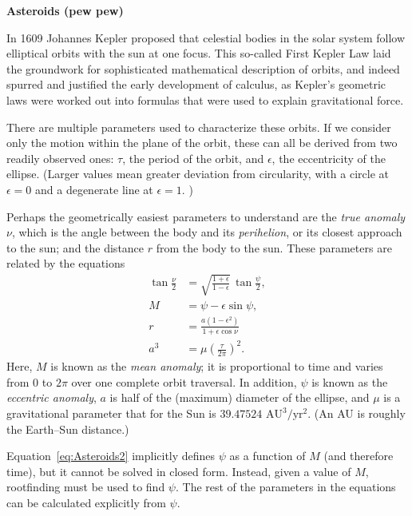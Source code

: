 \documentclass[11pt,twoside]{fncextra}
\begin{document}
\begin{center}
  \bf Asteroids (pew pew)
\end{center}

In 1609 Johannes Kepler proposed that celestial bodies in the solar system follow elliptical orbits with the sun at one focus. This so-called First Kepler Law laid the groundwork for sophisticated mathematical description of orbits, and indeed spurred and justified the early development of calculus, as Kepler's geometric laws were worked out into formulas that were used to explain gravitational force.

There are multiple parameters used to characterize these orbits. If we consider only the motion within the plane of the orbit, these can all be derived from two readily observed ones: $\tau$, the period of the orbit, and $\epsilon$, the eccentricity of the ellipse. (Larger values mean greater deviation from circularity, with a circle at $\epsilon=0$ and a degenerate line at $\epsilon=1$. )

Perhaps the geometrically easiest parameters to understand are the \emph{true anomaly} $\nu$, which is the angle between the body and its \emph{perihelion}, or its closest approach to the sun; and the distance $r$ from the body to the sun. These parameters are related by the equations \begin{align}
  \tan \frac{\nu}{2} &= \sqrt{\frac{1+\epsilon}{1-\epsilon}}\,
    \tan \frac{\psi}{2}, \label{eq:Asteroids1} \\
  M &= \psi - \epsilon \sin \psi, \label{eq:Asteroids2} \\
  r &=  \frac{a(1-\epsilon^2)}{1+\epsilon \cos \nu} \\
  a^3 &= \mu \left(\frac{\tau}{2\pi}\right)^2.
\end{align}
Here, $M$ is known as the \emph{mean anomaly}; it is proportional to time and varies from 0 to $2\pi$ over one complete orbit traversal. In addition, $\psi$ is known as the \emph{eccentric anomaly}, $a$ is half of the (maximum) diameter of the ellipse, and $\mu$ is a gravitational parameter that for the Sun is $39.47524$ $\text{AU}^3/\text{yr}^2$. (An AU is roughly the Earth--Sun distance.)

Equation~\eqref{eq:Asteroids2} implicitly defines $\psi$ as a function of $M$ (and therefore time), but it cannot be solved in closed form. Instead, given a value of $M$, rootfinding must be used to find $\psi$. The rest of the parameters in the equations can be calculated explicitly from $\psi$.
\end{document}
